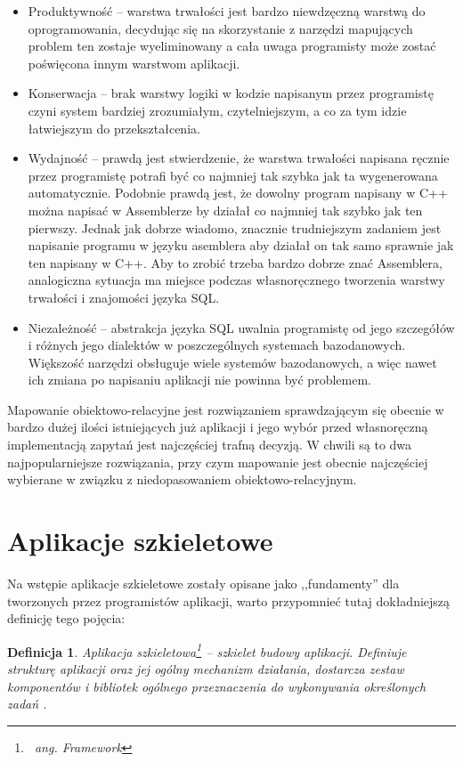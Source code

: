 \documentclass[12pt]{report}
\newtheorem{definition}{Definicja}
\begin{document}
\begin{itemize}
\item Produktywność -- warstwa trwałości jest bardzo niewdzęczną warstwą do oprogramowania, decydując się na skorzystanie z narzędzi mapujących problem ten zostaje
wyeliminowany a cała uwaga programisty może zostać poświę\-cona innym warstwom aplikacji.
\item Konserwacja -- brak warstwy logiki w kodzie napisanym przez programistę czyni system bardziej zrozumiałym, czytelniejszym, a co za tym idzie łatwie\-jszym do 
przekształcenia.
\item Wydajność -- prawdą jest stwierdzenie, że warstwa trwałości napisana ręcznie przez programistę potrafi być co najmniej tak szybka jak ta wygenerowana automatycznie.
Podobnie prawdą jest, że dowolny program napisany w C++ można napisać w Assemblerze by działał co najmniej tak szybko jak ten pierwszy. Jednak jak dobrze wiadomo,
znacznie trudniejszym zadaniem jest napisanie programu w języku asemblera aby działał on tak samo sprawnie jak ten napisany w C++. Aby to zrobić trzeba bardzo dobrze
znać Assemblera, analogiczna sytuacja ma miejsce podczas własnoręcznego tworzenia warstwy trwałości i znajomości języka SQL.
\item Niezależność -- abstrakcja języka SQL uwalnia programistę od jego szczegółów i różnych jego dialektów w poszczególnych systemach bazodanowych. Większość narzędzi
obsługuje wiele systemów bazodanowych, a więc nawet ich zmiana po napisaniu aplikacji nie powinna być problemem.
\end{itemize}

Mapowanie obiektowo-relacyjne jest rozwiązaniem sprawdzającym się obecnie w bardzo dużej ilości istniejących już aplikacji i jego wybór przed własnoręczną implementacją 
zapytań jest najczęściej trafną decyzją. W chwili są to dwa najpopularniejsze rozwiązania, przy czym mapowanie jest obecnie najczęściej wybierane w związku z
niedopasowaniem obiektowo-relacyjnym.

\section{Aplikacje szkieletowe}

Na wstępie aplikacje szkieletowe zostały opisane jako ,,fundamenty'' dla tworzonych przez programistów aplikacji, warto przypomnieć tutaj dokładniejszą definicję tego
pojęcia:

\begin{definition}
Aplikacja szkieletowa\footnote{~ang. Framework} -- szkielet budowy aplikacji. Definiuje strukturę aplikacji oraz jej ogólny mechanizm działania, dostarcza zestaw komponentów
i bibliotek ogólnego przeznaczenia do wykonywania określonych zadań \cite{framework}.
\end{definition}
\end{document}

